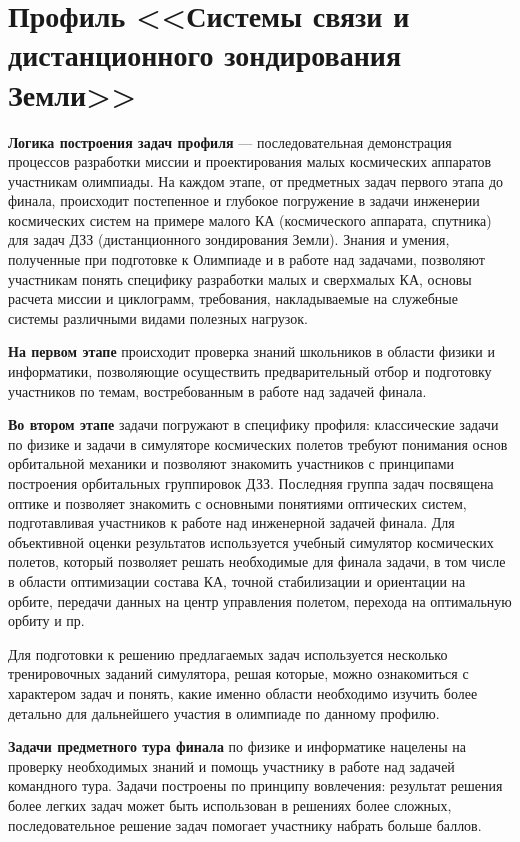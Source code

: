 

\chapter{Профиль <<Системы связи и дистанционного зондирования Земли>>}

\textbf{Логика построения задач профиля} — последовательная демонстрация процессов разработки миссии и проектирования малых космических аппаратов участникам олимпиады. На каждом этапе, от предметных задач первого этапа до финала, происходит постепенное и глубокое погружение в задачи инженерии космических систем на примере малого КА (космического аппарата, спутника) для задач ДЗЗ (дистанционного зондирования Земли). Знания и умения, полученные при подготовке к Олимпиаде и в работе над задачами, позволяют участникам понять специфику разработки малых и сверхмалых КА, основы расчета миссии и циклограмм, требования, накладываемые на служебные системы различными видами полезных нагрузок. 

\textbf{На первом этапе} происходит проверка знаний школьников в области физики и информатики, позволяющие осуществить предварительный отбор и подготовку участников по темам, востребованным в работе над задачей финала.

\textbf{Во втором этапе} задачи погружают в специфику профиля: классические задачи по физике и задачи в симуляторе космических полетов требуют понимания основ орбитальной механики и позволяют знакомить участников с принципами построения орбитальных группировок ДЗЗ. Последняя группа задач посвящена оптике и позволяет знакомить с основными понятиями оптических систем, подготавливая участников к работе над инженерной задачей финала. Для объективной оценки результатов используется учебный симулятор космических полетов, который позволяет решать необходимые для финала задачи, в том числе в области оптимизации состава КА, точной стабилизации и ориентации на орбите, передачи данных на центр управления полетом, перехода на оптимальную орбиту и пр.

Для подготовки к решению предлагаемых задач используется несколько тренировочных заданий симулятора, решая которые, можно ознакомиться с характером задач и понять, какие именно области необходимо изучить более детально для дальнейшего участия в олимпиаде по данному профилю.

\textbf{Задачи предметного тура финала} по физике и информатике нацелены на проверку необходимых знаний и помощь участнику в работе над задачей командного тура. Задачи  построены по принципу вовлечения: результат решения более легких задач может быть использован в решениях более сложных, последовательное решение задач помогает участнику набрать больше баллов.

